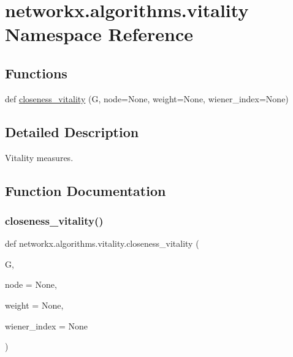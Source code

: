 \hypertarget{namespacenetworkx_1_1algorithms_1_1vitality}{}\section{networkx.\+algorithms.\+vitality Namespace Reference}
\label{namespacenetworkx_1_1algorithms_1_1vitality}
\subsection*{Functions}
\begin{DoxyCompactItemize}
\item 
def \hyperlink{namespacenetworkx_1_1algorithms_1_1vitality_a81e0666f2a3ef7ddd41535065c2e061a}{closeness\+\_\+vitality} (G, node=None, weight=None, wiener\+\_\+index=None)
\end{DoxyCompactItemize}


\subsection{Detailed Description}
\begin{DoxyVerb}Vitality measures.
\end{DoxyVerb}
 

\subsection{Function Documentation}
\mbox{\label{namespacenetworkx_1_1algorithms_1_1vitality_a81e0666f2a3ef7ddd41535065c2e061a}} 
\subsubsection{\texorpdfstring{closeness\+\_\+vitality()}{closeness\_vitality()}}
{\footnotesize\ttfamily def networkx.\+algorithms.\+vitality.\+closeness\+\_\+vitality (\begin{DoxyParamCaption}\item[{}]{G,  }\item[{}]{node = {\ttfamily None},  }\item[{}]{weight = {\ttfamily None},  }\item[{}]{wiener\+\_\+index = {\ttfamily None} }\end{DoxyParamCaption})}

